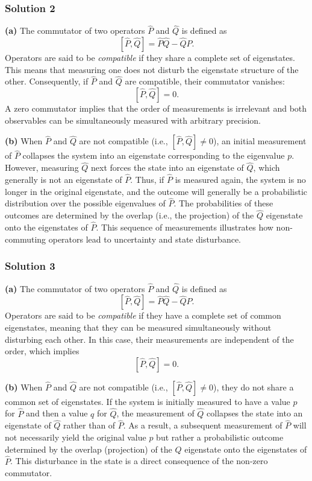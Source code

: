 \documentclass{article}
\begin{document}
\subsubsection{Solution 2}
\textbf{(a)} The commutator of two operators $\hat{P}$ and $\hat{Q}$ is defined as 
\[
[\hat{P},\hat{Q}] = \hat{P}\hat{Q} - \hat{Q}\hat{P}.
\]
Operators are said to be \textit{compatible} if they share a complete set of eigenstates. This means that measuring one does not disturb the eigenstate structure of the other. Consequently, if $\hat{P}$ and $\hat{Q}$ are compatible, their commutator vanishes:
\[
[\hat{P},\hat{Q}] = 0.
\]
A zero commutator implies that the order of measurements is irrelevant and both observables can be simultaneously measured with arbitrary precision.

\textbf{(b)} When $\hat{P}$ and $\hat{Q}$ are not compatible (i.e., $[\hat{P},\hat{Q}] \neq 0$), an initial measurement of $\hat{P}$ collapses the system into an eigenstate corresponding to the eigenvalue $p$. However, measuring $\hat{Q}$ next forces the state into an eigenstate of $\hat{Q}$, which generally is not an eigenstate of $\hat{P}$. Thus, if $\hat{P}$ is measured again, the system is no longer in the original eigenstate, and the outcome will generally be a probabilistic distribution over the possible eigenvalues of $\hat{P}$. The probabilities of these outcomes are determined by the overlap (i.e., the projection) of the $\hat{Q}$ eigenstate onto the eigenstates of $\hat{P}$. This sequence of measurements illustrates how non-commuting operators lead to uncertainty and state disturbance.

\subsubsection{Solution 3}
\textbf{(a)} The commutator of two operators $\hat{P}$ and $\hat{Q}$ is defined as 
\[
[\hat{P},\hat{Q}] = \hat{P}\hat{Q} - \hat{Q}\hat{P}.
\]
Operators are said to be \emph{compatible} if they have a complete set of common eigenstates, meaning that they can be measured simultaneously without disturbing each other. In this case, their measurements are independent of the order, which implies 
\[
[\hat{P},\hat{Q}] = 0.
\]

\textbf{(b)} When $\hat{P}$ and $\hat{Q}$ are not compatible (i.e., $[\hat{P},\hat{Q}] \neq 0$), they do not share a common set of eigenstates. If the system is initially measured to have a value $p$ for $\hat{P}$ and then a value $q$ for $\hat{Q}$, the measurement of $\hat{Q}$ collapses the state into an eigenstate of $\hat{Q}$ rather than of $\hat{P}$. As a result, a subsequent measurement of $\hat{P}$ will not necessarily yield the original value $p$ but rather a probabilistic outcome determined by the overlap (projection) of the $\hat{Q}$ eigenstate onto the eigenstates of $\hat{P}$. This disturbance in the state is a direct consequence of the non-zero commutator.
\end{document}
